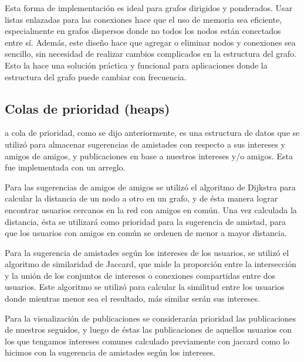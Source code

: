 \documentclass[9pt,letterpaper,onecolumn]{rho-class/rho}
\begin{document}
Esta forma de implementación es ideal para grafos dirigidos y ponderados. Usar listas enlazadas para las conexiones hace que el uso de memoria sea eficiente, especialmente en grafos dispersos donde no todos los nodos están conectados entre sí. Además, este diseño hace que agregar o eliminar nodos y conexiones sea sencillo, sin necesidad de realizar cambios complicados en la estructura del grafo. Esto la hace una solución práctica y funcional para aplicaciones donde la estructura del grafo puede cambiar con frecuencia.


\subsection{Colas de prioridad (heaps)}
	a cola de prioridad, como se dijo anteriormente, es una estructura de datos que se utilizó para almacenar sugerencias de amistades con respecto a sus intereses y amigos de amigos, y publicaciones en base a nuestros intereses y/o amigos. Esta fue implementada con un arreglo. 
	
	\vspace{0.5cm}

	Para las sugerencias de amigos de amigos se utilizó el algoritmo de Dijkstra para calcular la distancia de un nodo a otro en un grafo, y de ésta manera lograr encontrar usuarios cercanos en la red con amigos en común. Una vez calculada la distancia, ésta se utilizará como prioridad para la sugerencia de amistad, para que los usuarios con amigos en común se ordenen de menor a mayor distancia.
	
	\vspace{0.5cm}

	Para la sugerencia de amistades según los intereses de los usuarios, se utilizó el algoritmo de similaridad de Jaccard, que mide la proporción entre la intersección y la unión de los conjuntos de intereses o conexiones compartidas entre dos usuarios. Este algoritmo se utilizó para calcular la similitud entre los usuarios donde mientras menor sea el resultado, más similar serán sus intereses.
	
	\vspace{0.5cm}

	Para la visualización de publicaciones se considerarán prioridad las publicaciones de nuestros seguidos, y luego de éstas las publicaciones de aquellos usuarios con los que tengamos intereses comunes calculado previamente con jaccard como lo hicimos con la sugerencia de amistades según los intereses.
	
\end{document}
